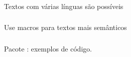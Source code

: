 \begin{frame}
  \frametitle{}
  \Huge
  Textos com várias línguas são possíveis
\end{frame}

\begin{frame}
  \frametitle{}
  \Huge
  Use macros para textos mais semânticos
\end{frame}

\begin{frame}
  \frametitle{}
  \Huge
  Pacote : exemplos de código.
\end{frame}
